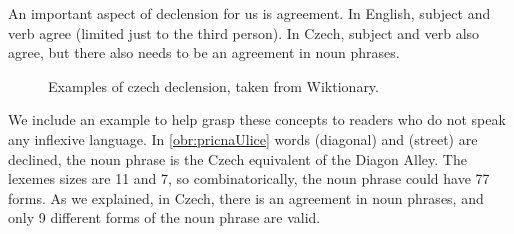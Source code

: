 An important aspect of declension for us is agreement. In English, subject and verb agree (limited just to the third person). In Czech, subject and verb also agree, but there also needs to be an agreement in noun phrases. 


\begin{figure}
\centering
{}
\qquad
{}

\caption{Examples of czech declension, taken from Wiktionary.\label{obr:pricnaUlice}}
\end{figure}


We include an example to help grasp these concepts to readers who do not speak any inflexive language. In \autoref{obr:pricnaUlice} words  (diagonal) and  (street) are declined, the noun phrase  is the Czech equivalent of the Diagon Alley. The lexemes sizes are 11 and 7, so combinatorically, the noun phrase could have 77 forms. As we explained, in Czech, there is an agreement in noun phrases, and only 9 different forms of the noun phrase  are valid. 



